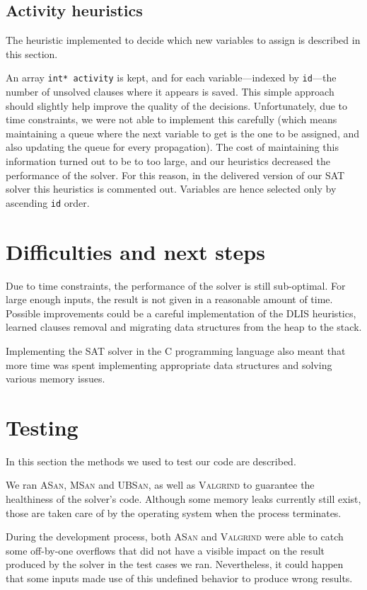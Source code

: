 \subsection{Activity heuristics}
The heuristic implemented to decide which new variables to assign is described in this section.

An array \texttt{int* activity} is kept, and for each variable---indexed by \texttt{id}---the number of unsolved clauses where it appears is saved. This simple approach should slightly help improve the quality of the decisions. Unfortunately, due to time constraints, we were not able to implement this carefully (which means maintaining a queue where the next variable to get is the one to be assigned, and also updating the queue for every propagation). The cost of maintaining this information turned out to be to too large, and our heuristics decreased the performance of the solver. For this reason, in the delivered version of our SAT solver this heuristics is commented out. Variables are hence selected only by ascending \texttt{id} order.
    
\section{Difficulties and next steps}
Due to time constraints, the performance of the solver is still sub-optimal. For large enough inputs, the result is not given in a reasonable amount of time. Possible improvements could be a careful implementation of the DLIS heuristics, learned clauses removal and migrating data structures from the heap to the stack.

Implementing the SAT solver in the C programming language also meant that more time was spent implementing appropriate data structures and solving various memory issues.
    
\section{Testing}
In this section the methods we used to test our code are described.

We ran \textsc{ASan}, \textsc{MSan} and \textsc{UBSan}, as well as \textsc{Valgrind} to guarantee the healthiness of the solver's code. Although some memory leaks currently still exist, those are taken care of by the operating system when the process terminates.

During the development process, both \textsc{ASan} and \textsc{Valgrind} were able to catch some off-by-one overflows that did not have a visible impact on the result produced by the solver in the test cases we ran. Nevertheless, it could happen that some inputs made use of this undefined behavior to produce wrong results.

